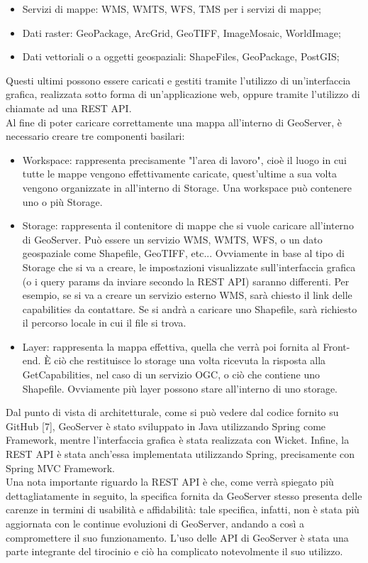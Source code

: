 \begin{itemize}
      \item Servizi di mappe: WMS, WMTS, WFS, TMS per i servizi di mappe;
      \item Dati raster: GeoPackage, ArcGrid, GeoTIFF, ImageMosaic, WorldImage;
      \item Dati vettoriali o a oggetti geospaziali: ShapeFiles, GeoPackage, PostGIS;
\end{itemize}
Questi ultimi possono essere caricati e gestiti tramite l'utilizzo di un'interfaccia grafica, realizzata sotto forma di un'applicazione web, oppure tramite l'utilizzo di chiamate ad una REST API.
\\Al fine di poter caricare correttamente una mappa all'interno di GeoServer, è necessario creare tre componenti basilari:
\begin{itemize}
      \item Workspace: rappresenta precisamente "l'area di lavoro", cioè il luogo in cui tutte le mappe vengono effettivamente caricate, quest'ultime a sua volta vengono organizzate in all'interno di Storage. Una workspace può contenere uno o più Storage.
      \item Storage: rappresenta il contenitore di mappe che si vuole caricare all'interno di GeoServer. Può essere un servizio WMS, WMTS, WFS, o un dato geospaziale come Shapefile, GeoTIFF, etc... Ovviamente in base al tipo di Storage che si va a creare, le impostazioni visualizzate sull'interfaccia grafica (o i query params da inviare secondo la REST API) saranno differenti. Per esempio, se si va a creare un servizio esterno WMS, sarà chiesto il link delle capabilities da contattare. Se si andrà a caricare uno Shapefile, sarà richiesto il percorso locale in cui il file si trova.
      \item Layer: rappresenta la mappa effettiva, quella che verrà poi fornita al Front-end. È ciò che restituisce lo storage una volta ricevuta la risposta alla GetCapabilities, nel caso di un servizio OGC, o ciò che contiene uno Shapefile. Ovviamente più layer possono stare all'interno di uno storage.
\end{itemize}
Dal punto di vista di architetturale, come si può vedere dal codice fornito su GitHub [7], GeoServer è stato sviluppato in Java utilizzando Spring come Framework, mentre l’interfaccia grafica è stata realizzata con Wicket. Infine, la REST API è stata anch'essa implementata utilizzando Spring, precisamente con Spring MVC Framework.
\\Una nota importante riguardo la REST API è che, come verrà spiegato più dettagliatamente in seguito, la specifica fornita da GeoServer stesso presenta delle carenze in termini di usabilità e affidabilità: tale specifica, infatti, non è stata più aggiornata con le continue evoluzioni di GeoServer, andando a così a compromettere il suo funzionamento. L'uso delle API di GeoServer è stata una parte integrante del tirocinio e ciò ha complicato notevolmente il suo utilizzo.

